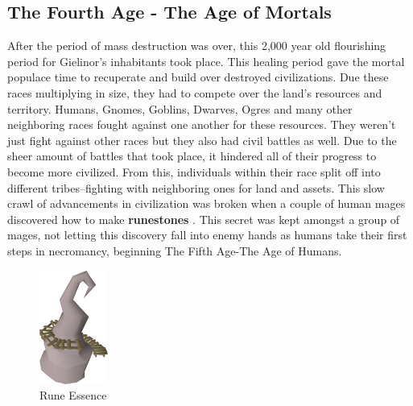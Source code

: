 \documentclass{article}
\newlength\myheight
\newlength\mydepth
\newcommand*\inlinegraphics[1]{%
  \settototalheight\myheight{Xygp}%
  \settodepth\mydepth{Xygp}%
  \raisebox{-\mydepth}{\texttt{[image: \#1]}}%
}
\begin{document}
\subsection{The Fourth Age - The Age of Mortals}
After the period of mass destruction was over, this 2,000 year old flourishing period for Gielinor's inhabitants took place. This healing period gave the mortal populace time to recuperate and build over destroyed civilizations. Due these races multiplying in size, they had to compete over the land's resources and territory. Humans, Gnomes, Goblins, Dwarves, Ogres and many other neighboring races fought against one another for these resources. They weren't just fight against other races but they also had civil battles as well. Due to the sheer amount of battles that took place, it hindered all of their progress to become more civilized. From this, individuals within their race split off into different tribes--fighting with neighboring ones for land and assets. This slow crawl of advancements in civilization was broken when a couple of human mages discovered how to make \textbf{runestones}\inlinegraphics{air.png}. This secret was kept amongst a group of mages, not letting this discovery fall into enemy hands as humans take their first steps in necromancy, beginning The Fifth Age-The Age of Humans.
\newpage

\begin{figure}
\centering
\includegraphics[width=0.2\textwidth]{runeessence.png}
\caption*{\small \label{fig:wise}Rune Essence}
\end{figure} 
\end{document}
